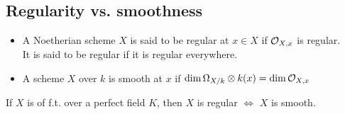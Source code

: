 \documentclass[../main.tex]{subfiles}
\begin{document}
\subsection{Regularity vs. smoothness}
\begin{defn}
	\begin{itemize}
	\item A Noetherian scheme $X$ is said to be regular at $x\in X$ if $\mathcal{O}_{X,x} $ is regular.\\
		It is said to be regular if it is regular everywhere.
	\item A scheme $X$ over $k$  is smooth at $x$ if $\dim \Omega_{X/k} \otimes k( x) = \dim \mathcal{O}_{X,x} $ 
	\end{itemize}
\end{defn}
\begin{crly}
If $X$ is of f.t. over a perfect field $K$, then $X$ is regular $\iff$ $X$ is smooth.
\end{crly}
\end{document}
